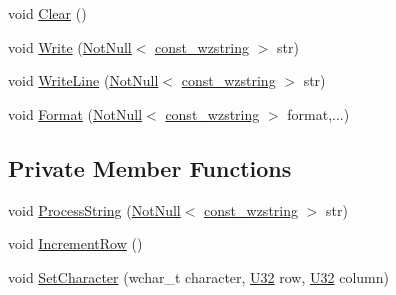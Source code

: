 \begin{DoxyCompactItemize}
\item 
void \mbox{\hyperlink{classmage_1_1script_1_1_text_console_script_a274764deea9f02ec77515680456548d6}{Clear}} ()
\item 
void \mbox{\hyperlink{classmage_1_1script_1_1_text_console_script_a46610edcf7a1707476b87ad64f1ee68d}{Write}} (\mbox{\hyperlink{namespacemage_a8769f9d670d6b585ea306cb1062af94b}{Not\+Null}}$<$ \mbox{\hyperlink{namespacemage_ac409e0f2a22292a3a4cd42742994fbf0}{const\+\_\+wzstring}} $>$ str)
\item 
void \mbox{\hyperlink{classmage_1_1script_1_1_text_console_script_ac8f0361bc1d703b56f1d8be43a32f0ae}{Write\+Line}} (\mbox{\hyperlink{namespacemage_a8769f9d670d6b585ea306cb1062af94b}{Not\+Null}}$<$ \mbox{\hyperlink{namespacemage_ac409e0f2a22292a3a4cd42742994fbf0}{const\+\_\+wzstring}} $>$ str)
\item 
void \mbox{\hyperlink{classmage_1_1script_1_1_text_console_script_a6de4d411f60dd62c507c6380ac987030}{Format}} (\mbox{\hyperlink{namespacemage_a8769f9d670d6b585ea306cb1062af94b}{Not\+Null}}$<$ \mbox{\hyperlink{namespacemage_ac409e0f2a22292a3a4cd42742994fbf0}{const\+\_\+wzstring}} $>$ format,...)
\end{DoxyCompactItemize}
\subsection*{Private Member Functions}
\begin{DoxyCompactItemize}
\item 
void \mbox{\hyperlink{classmage_1_1script_1_1_text_console_script_a9c990e0256f01eb4cc1622bf346f32a5}{Process\+String}} (\mbox{\hyperlink{namespacemage_a8769f9d670d6b585ea306cb1062af94b}{Not\+Null}}$<$ \mbox{\hyperlink{namespacemage_ac409e0f2a22292a3a4cd42742994fbf0}{const\+\_\+wzstring}} $>$ str)
\item 
void \mbox{\hyperlink{classmage_1_1script_1_1_text_console_script_a3d4cba4fd8a2733933a7a444c6beaf1a}{Increment\+Row}} ()
\item 
void \mbox{\hyperlink{classmage_1_1script_1_1_text_console_script_a18bdee79ee6f53e28f90b607c36c8188}{Set\+Character}} (wchar\+\_\+t character, \mbox{\hyperlink{namespacemage_a41c104c036fba3756a74e19f793eeaa1}{U32}} row, \mbox{\hyperlink{namespacemage_a41c104c036fba3756a74e19f793eeaa1}{U32}} column)
\end{DoxyCompactItemize}

